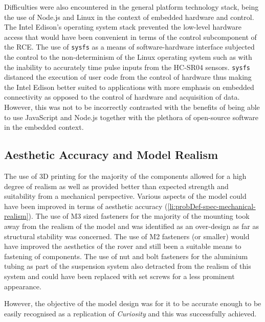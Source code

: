     Difficulties were also encountered in the general platform technology stack, being the use of Node.js and Linux in the context of embedded hardware and control. The Intel Edison's operating system stack prevented the low-level hardware access that would have been convenient in terms of the control subcomponent of the RCE. The use of \texttt{sysfs} as a means of software-hardware interface subjected the control to the non-determinism of the Linux operating system such as with the inability to accurately time pulse inputs from the HC-SR04 sensors. \texttt{sysfs} distanced the execution of user code from the control of hardware thus making the Intel Edison better suited to applications with more emphasis on embedded connectivity as opposed to the control of hardware and acquisition of data. However, this was not to be incorrectly contrasted with the benefits of being able to use JavaScript and Node.js together with the plethora of open-source software in the embedded context.
  
  \subsection{Aesthetic Accuracy and Model Realism}
  \label{subsec:rec-aesthetics}
    The use of 3D printing for the majority of the components allowed for a high degree of realism as well as provided better than expected strength and suitability from a mechanical perspective. Various aspects of the model could have been improved in terms of aesthetic accuracy (\ref{li:probDef-spec-mechanical-realism}). The use of M3 sized fasteners for the majority of the mounting took away from the realism of the model and was identified as an over-design as far as structural stability was concerned. The use of M2 fasteners (or smaller) would have improved the aesthetics of the rover and still been a suitable means to fastening of components. The use of nut and bolt fasteners for the aluminium tubing as part of the suspension system also detracted from the realism of this system and could have been replaced with set screws for a less prominent appearance.
    
    However, the objective of the model design was for it to be accurate enough to be easily recognised as a replication of \textit{Curiosity} and this was successfully achieved.
  